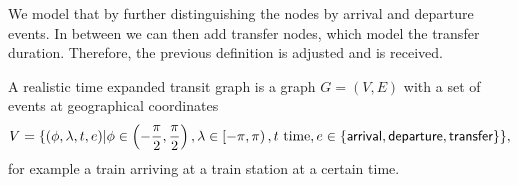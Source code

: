 	We model that by further distinguishing the nodes by arrival and departure events. In between we can then add transfer
	nodes, which model the transfer duration. Therefore, the previous definition is adjusted and  is received.
	\begin{mydef}\label{realisticTransitGraph}
		A \textnormal{realistic time expanded transit graph} is a graph $G = (V, E)$ with a set of events at geographical coordinates
		\begin{align*}
			V = \{(\phi, \lambda, t, e) | \phi \in \left(-\frac{\pi}{2}, \frac{\pi}{2}\right), \lambda \in \left[-\pi, \pi\right),
			t \text{ time}, e \in \{\textsf{arrival}, \textsf{departure}, \textsf{transfer}\}\},
		\end{align*}
		for example a train arriving at a train station at a certain time.
		

\end{mydef}
